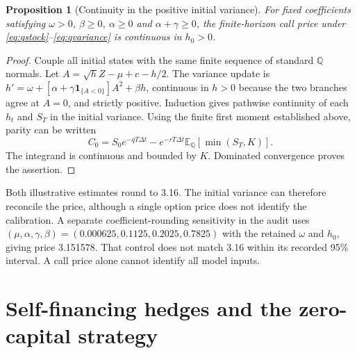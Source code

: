 \documentclass[11pt,a4paper]{article}
\newcommand{\E}{\mathbb E}
\newcommand{\Q}{\mathbb Q}
\newcommand{\ind}{\mathbf 1}
\newcommand{\dt}{\Delta t}
\newtheorem{proposition}{Proposition}
\theoremstyle{remark}
\begin{document}
\begin{proposition}[Continuity in the positive initial variance]
For fixed coefficients satisfying $\omega>0$, $\beta\geq0$, $\alpha\geq0$ and $\alpha+\gamma\geq0$, the finite-horizon call price under \eqref{eq:qstock}--\eqref{eq:qvariance} is continuous in $h_0>0$.
\end{proposition}
\begin{proof}
Couple all initial states with the same finite sequence of standard $\Q$ normals. Let $A=\sqrt hZ-\mu+c-h/2$. The variance update is $h'=\omega+[\alpha+\gamma\ind_{\{A<0\}}]A^2+\beta h$, continuous in $h>0$ because the two branches agree at $A=0$, and strictly positive. Induction gives pathwise continuity of each $h_t$ and $S_T$ in the initial variance. Using the finite first moment established above, parity can be written
\begin{equation}
 C_0=S_0e^{-qT\dt}-e^{-rT\dt}\E_{\Q}[\min(S_T,K)].
\end{equation}
The integrand is continuous and bounded by $K$. Dominated convergence proves the assertion.
\end{proof}
Both illustrative estimates round to 3.16. The initial variance can therefore reconcile the price, although a single option price does not identify the calibration. A separate coefficient-rounding sensitivity in the audit uses $(\mu,\alpha,\gamma,\beta)=(0.000625,0.1125,0.2025,0.7825)$ with the retained $\omega$ and $h_0$, giving price 3.151578. That control does not match 3.16 within its recorded 95\% interval. A call price alone cannot identify all model inputs.

\section{Self-financing hedges and the zero-capital strategy}
\end{document}
